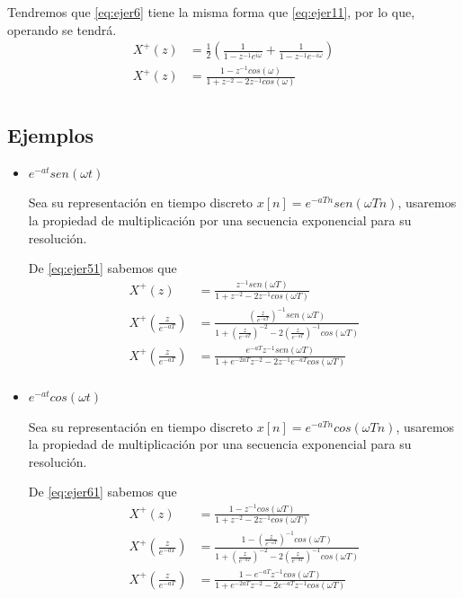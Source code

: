 \documentclass[12pt]{article}
\begin{document}
Tendremos que \ref{eq:ejer6} tiene la misma forma que \ref{eq:ejer11}, por lo que, operando se tendrá.
\begin{equation}
    \begin{split}
        X^+(z)&=\frac{1}{2}(\frac{1}{1-z^{-1}e^{i\omega}}+\frac{1}{1-z^{-1}e^{-i\omega}})\\
        X^+(z)&=\frac{1-z^{-1}cos(\omega)}{1+z^{-2}-2z^{-1}cos(\omega)}\\
    \end{split}
    \label{eq:ejer61}
\end{equation}

\subsection{Ejemplos}

\begin{itemize}
    \item \textbf{$e^{-at}sen(\omega t)$}
    \vspace{5mm}

Sea su representación en tiempo discreto $x[n]=e^{-aTn}sen(\omega Tn)$, usaremos la propiedad de multiplicación por una secuencia exponencial para su resolución.

De \ref{eq:ejer51} sabemos que 
\begin{equation}
    \begin{split}
        X^+(z)&=\frac{z^{-1}sen(\omega T)}{1+z^{-2}-2z^{-1}cos(\omega T)}\\
        X^+(\frac{z}{e^{-aT}})&=\frac{(\frac{z}{e^{-aT}})^{-1}sen(\omega T)}{1+(\frac{z}{e^{-aT}})^{-2}-2(\frac{z}{e^{-aT}})^{-1}cos(\omega T)}\\
        X^+(\frac{z}{e^{-aT}})&=\frac{e^{-aT}z^{-1}sen(\omega T)}{1+e^{-2aT}z^{-2}-2z^{-1}e^{-aT}cos(\omega T)}\\
    \end{split}
    \label{eq:ejer62}
\end{equation}

\item \textbf{$e^{-at}cos(\omega t)$}
    \vspace{5mm}

Sea su representación en tiempo discreto $x[n]=e^{-aTn}cos(\omega Tn)$, usaremos la propiedad de multiplicación por una secuencia exponencial para su resolución.

De \ref{eq:ejer61} sabemos que 
\begin{equation}
    \begin{split}
        X^+(z)&=\frac{1-z^{-1}cos(\omega T)}{1+z^{-2}-2z^{-1}cos(\omega T)}\\
        X^+(\frac{z}{e^{-aT}})&=\frac{1-(\frac{z}{e^{-aT}})^{-1}cos(\omega T)}{1+(\frac{z}{e^{-aT}})^{-2}-2(\frac{z}{e^{-aT}})^{-1}cos(\omega T)}\\
        X^+(\frac{z}{e^{-aT}})&=\frac{1-e^{-aT}z^{-1}cos(\omega T)}{1+e^{-2aT}z^{-2}-2e^{-aT}z^{-1}cos(\omega T)}\\
    \end{split}
    \label{eq:ejer72}
\end{equation}


\end{itemize}
\end{document}
